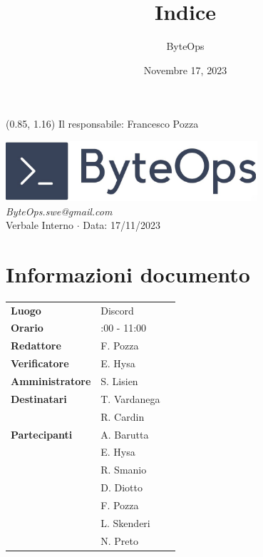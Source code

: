 \documentclass{article}
\title{\textbf{\fontsize{28}{6}\selectfont Indice}}
\author{\fontsize{14}{6}\selectfont ByteOps}
\date{Novembre 17, 2023}
\begin{document}
\begin{textblock*}{\textwidth}(0.85\textwidth, 1.16\textheight)
    Il responsabile: Francesco Pozza
\end{textblock*}

\pagestyle{fancy}
\begin{center}
\includegraphics[width = 0.7\textwidth]{../../../Images/logo.png} \\
\vspace{0.2cm}
\textcolor[RGB]{60, 60, 60}{\textit{ByteOps.swe@gmail.com}} \\
\vspace{1cm}
\fontsize{16}{6}\selectfont Verbale Interno $\cdot$ Data: 17/11/2023 \\
\vspace{0.5cm}
\end{center}

\section*{Informazioni documento}
\def\arraystretch{1.2}
\begin{tabular}{>{\raggedleft\arraybackslash}p{}|>{\raggedright\arraybackslash}p{}c}
\hline
\addlinespace
\textbf{Luogo} & Discord \vspace{10pt} \\
\textbf{Orario} & 9:00 - 11:00 \vspace{10pt} \\
\textbf{Redattore} & F. Pozza \vspace{10pt} \\
\textbf{Verificatore} & E. Hysa \vspace{10pt} \\
\textbf{Amministratore} & S. Lisien \vspace{10pt} \\
\textbf{Destinatari} & T. Vardanega \\ & R. Cardin \vspace{10pt} \\
\textbf{Partecipanti} & A. Barutta \\ & E. Hysa \\ & R. Smanio \\ & D. Diotto \\ & F. Pozza \\ & L. Skenderi \\ & N. Preto \vspace{10pt} \\
\end{tabular}
\pagebreak 
\end{document}
